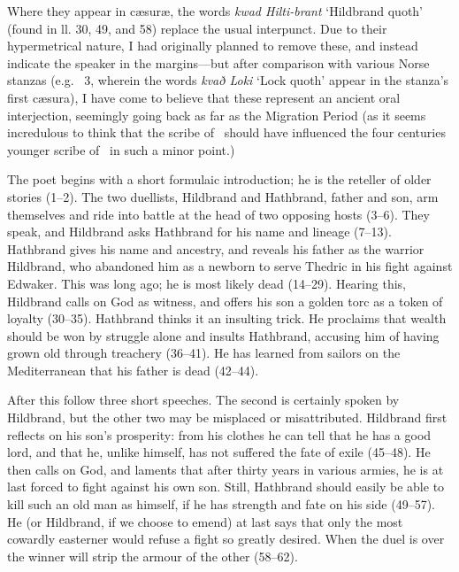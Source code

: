 Where they appear in cæsuræ, the words \emph{kwad Hilti-brant} ‘Hildbrand quoth’ (found in ll. 30, 49, and 58) replace the usual interpunct. Due to their hypermetrical nature, I had originally planned to remove these, and instead indicate the speaker in the margins—but after comparison with various Norse stanzas (e.g. \Reginsmal\ 3, wherein the words \emph{kvað Loki} ‘Lock quoth’ appear in the stanza’s first cæsura), I have come to believe that these represent an ancient oral interjection, seemingly going back as far as the Migration Period (as it seems incredulous to think that the scribe of \HildMS\ should have influenced the four centuries younger scribe of \Regius\ in such a minor point.)


\sectionline

The poet begins with a short formulaic introduction; he is the reteller of older stories (1–2).  The two duellists, Hildbrand and Hathbrand, father and son, arm themselves and ride into battle at the head of two opposing hosts (3–6). They speak, and Hildbrand asks Hathbrand for his name and lineage (7–13). Hathbrand gives his name and ancestry, and reveals his father as the warrior Hildbrand, who abandoned him as a newborn to serve Thedric in his fight against Edwaker. This was long ago; he is most likely dead (14–29). Hearing this, Hildbrand calls on God as witness, and offers his son a golden torc as a token of loyalty (30–35). Hathbrand thinks it an insulting trick. He proclaims that wealth should be won by struggle alone and insults Hathbrand, accusing him of having grown old through treachery (36–41). He has learned from sailors on the Mediterranean that his father is dead (42–44).

After this follow three short speeches. The second is certainly spoken by Hildbrand, but the other two may be misplaced or misattributed. Hildbrand first reflects on his son’s prosperity: from his clothes he can tell that he has a good lord, and that he, unlike himself, has not suffered the fate of exile (45–48). He then calls on God, and laments that after thirty years in various armies, he is at last forced to fight against his own son. Still, Hathbrand should easily be able to kill such an old man as himself, if he has strength and fate on his side (49–57). He (or Hildbrand, if we choose to emend) at last says that only the most cowardly easterner would refuse a fight so greatly desired. When the duel is over the winner will strip the armour of the other (58–62).

